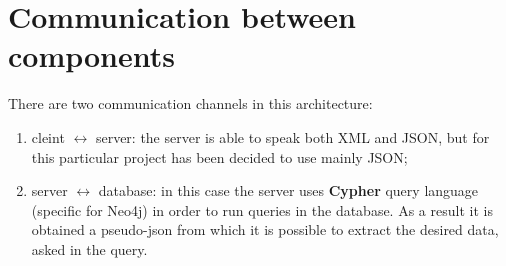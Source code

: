\section{Communication between components}
There are two communication channels in this architecture:
\begin{enumerate}
  \item cleint $\leftrightarrow$ server: the server is able to speak both XML and JSON, but for this particular project has been decided to use mainly JSON;
  \item server $\leftrightarrow$ database: in this case the server uses \textbf{Cypher} query language (specific for Neo4j) in order to run queries in the database. As a result it is obtained a pseudo-json from which it is possible to extract the desired data, asked in the query.
\end{enumerate}

